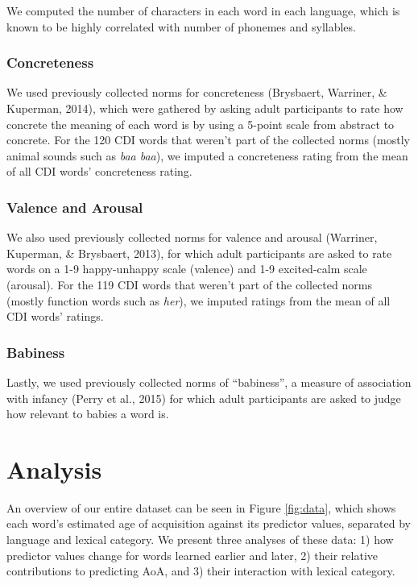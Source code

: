 \documentclass[10pt, letterpaper]{article}
\begin{document}
We computed the number of characters in each word in each language,
which is known to be highly correlated with number of phonemes and
syllables.

\subsubsection{Concreteness}\label{concreteness}

We used previously collected norms for concreteness (Brysbaert,
Warriner, \& Kuperman, 2014), which were gathered by asking adult
participants to rate how concrete the meaning of each word is by using a
5-point scale from abstract to concrete. For the 120 CDI words that
weren't part of the collected norms (mostly animal sounds such as
\emph{baa baa}), we imputed a concreteness rating from the mean of all
CDI words' concreteness rating.

\subsubsection{Valence and Arousal}\label{valence-and-arousal}

We also used previously collected norms for valence and arousal
(Warriner, Kuperman, \& Brysbaert, 2013), for which adult participants
are asked to rate words on a 1-9 happy-unhappy scale (valence) and 1-9
excited-calm scale (arousal). For the 119 CDI words that weren't part of
the collected norms (mostly function words such as \emph{her}), we
imputed ratings from the mean of all CDI words' ratings.

\subsubsection{Babiness}\label{babiness}

Lastly, we used previously collected norms of ``babiness'', a measure of
association with infancy (Perry et al., 2015) for which adult
participants are asked to judge how relevant to babies a word is.

\section{Analysis}\label{analysis}

An overview of our entire dataset can be seen in Figure \ref{fig:data},
which shows each word's estimated age of acquisition against its
predictor values, separated by language and lexical category. We present
three analyses of these data: 1) how predictor values change for words
learned earlier and later, 2) their relative contributions to predicting
AoA, and 3) their interaction with lexical category.
\end{document}
